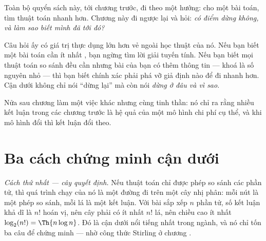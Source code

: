 \documentclass[../../algorithm.tex]{subfiles}
\begin{document}
Toàn bộ quyển sách này, tới chương trước, đi theo một hướng: cho một bài toán, tìm thuật toán nhanh hơn. Chương này đi ngược lại và hỏi: \emph{có điểm dừng không, và làm sao biết mình đã tới đó?}

Câu hỏi ấy có giá trị thực dụng lớn hơn vẻ ngoài học thuật của nó. Nếu bạn biết một bài toán cần ít nhất , bạn ngừng tìm lời giải tuyến tính. Nếu bạn biết mọi thuật toán so sánh đều cần  nhưng bài của bạn có thêm thông tin --- khoá là số nguyên nhỏ --- thì bạn biết chính xác phải phá vỡ giả định nào để đi nhanh hơn. Cận dưới không chỉ nói ``dừng lại'' mà còn nói \emph{dừng ở đâu và vì sao}.

Nửa sau chương làm một việc khác nhưng cùng tinh thần: nó chỉ ra rằng nhiều kết luận trong các chương trước là hệ quả của một mô hình chi phí cụ thể, và khi mô hình đổi thì kết luận đổi theo.

\section{Ba cách chứng minh cận dưới}

\emph{Cách thứ nhất --- cây quyết định.} Nếu thuật toán chỉ được phép so sánh các phần tử, thì quá trình chạy của nó là một đường đi trên một cây nhị phân: mỗi nút là một phép so sánh, mỗi lá là một kết luận. Với bài sắp xếp \(n\) phần tử, số kết luận khả dĩ là \(n!\) hoán vị, nên cây phải có ít nhất \(n!\) lá, nên chiều cao ít nhất \(\log_2(n!) = \Th{n\log n}\). Đó là cận dưới nổi tiếng nhất trong ngành, và nó chỉ tốn ba câu để chứng minh --- nhờ công thức Stirling ở chương .
\end{document}
